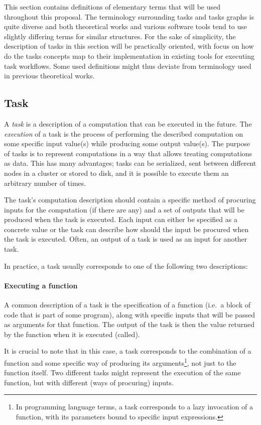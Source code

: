 This section contains definitions of elementary terms that will be used throughout this proposal.
The terminology surrounding tasks and tasks graphs is quite diverse and both theoretical works
and various software tools tend to use slightly differing terms for similar structures. For the
sake of simplicity, the description of tasks in this section will be practically oriented, with
focus on how do the tasks concepts map to their implementation in existing tools for executing
task workflows. Some used definitions might thus deviate from terminology used in previous
theoretical works.

\subsection{Task}
A \emph{task} is a description of a computation that can be executed in the future. The
\textit{execution} of a task is the process of performing the described computation on some
specific input value(s) while producing some output value(s). The purpose of tasks is to represent
computations in a way that allows treating computations as data. This has many advantages; tasks
can be serialized, sent between different nodes in a cluster or stored to disk, and it is possible
to execute them an arbitrary number of times.

The task's computation description should contain a specific method of procuring inputs
for the computation (if there are any) and a set of outputs that will be produced when the task
is executed. Each input can either be specified as a concrete value or the task can describe how
should the input be procured when the task is executed. Often, an output of a task is used as
an input for another task.

In practice, a task usually corresponds to one of the following two descriptions:

\paragraph{Executing a function} A common description of a task is the specification of a
function (i.e.\ a block of code that is part of some program), along with specific inputs that will
be passed as arguments for that function. The output of the task is then the value returned by the
function when it is executed (called).

It is crucial to note that in this case, a task corresponds to the combination of a function and
some specific way of producing its arguments\footnote{In programming language terms, a task
corresponds to a lazy invocation of a function, with its parameters bound to specific input
expressions.}, not just to the function itself. Two different tasks might represent the
execution of the same function, but with different (ways of procuring) inputs.

